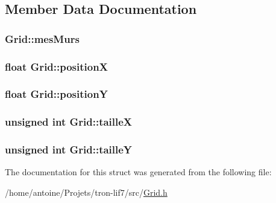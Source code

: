 \subsection{Member Data Documentation}
\hypertarget{structGrid_a3e5062eabb47200f6c3638903c2b5303}{
\subsubsection[{mes\-Murs}]{ Grid\-::mes\-Murs}}\label{structGrid_a3e5062eabb47200f6c3638903c2b5303}
\hypertarget{structGrid_a1712b348175d1449f924218abc2c180b}{
\subsubsection[{position\-X}]{\setlength{\rightskip}{0pt plus 5cm}float Grid\-::position\-X}}\label{structGrid_a1712b348175d1449f924218abc2c180b}
\hypertarget{structGrid_aa084d4ec2894df907e02718c88ab4060}{
\subsubsection[{position\-Y}]{\setlength{\rightskip}{0pt plus 5cm}float Grid\-::position\-Y}}\label{structGrid_aa084d4ec2894df907e02718c88ab4060}
\hypertarget{structGrid_ad6ec58066a6303fbc2aa5443840cf067}{
\subsubsection[{taille\-X}]{\setlength{\rightskip}{0pt plus 5cm}unsigned int Grid\-::taille\-X}}\label{structGrid_ad6ec58066a6303fbc2aa5443840cf067}
\hypertarget{structGrid_adc12ffc8da211af2444db8a2007e5a7d}{
\subsubsection[{taille\-Y}]{\setlength{\rightskip}{0pt plus 5cm}unsigned int Grid\-::taille\-Y}}\label{structGrid_adc12ffc8da211af2444db8a2007e5a7d}


The documentation for this struct was generated from the following file\-:\begin{DoxyCompactItemize}
\item 
/home/antoine/\-Projets/tron-\/lif7/src/\hyperlink{Grid_8h}{Grid.\-h}\end{DoxyCompactItemize}
